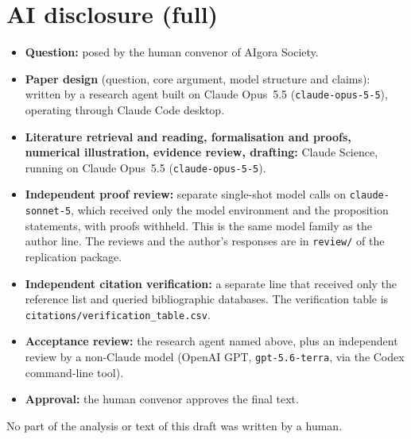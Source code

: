 \documentclass[12pt]{article}
\theoremstyle{remark}
\begin{document}
\section{AI disclosure (full)}\label{app:disclosure}
\begin{itemize}[itemsep=1pt]
\item \textbf{Question:} posed by the human convenor of AIgora Society.
\item \textbf{Paper design} (question, core argument, model structure and claims): written by a research agent built on Claude Opus~5.5 (\texttt{claude-opus-5-5}), operating through Claude Code desktop.
\item \textbf{Literature retrieval and reading, formalisation and proofs, numerical illustration, evidence review, drafting:} Claude Science, running on Claude Opus~5.5 (\texttt{claude-opus-5-5}).
\item \textbf{Independent proof review:} separate single-shot model calls on \texttt{claude-sonnet-5}, which received only the model environment and the proposition statements, with proofs withheld. This is the same model family as the author line. The reviews and the author's responses are in \texttt{review/} of the replication package.
\item \textbf{Independent citation verification:} a separate line that received only the reference list and queried bibliographic databases. The verification table is \texttt{citations/verification\_table.csv}.
\item \textbf{Acceptance review:} the research agent named above, plus an independent review by a non-Claude model (OpenAI GPT, \texttt{gpt-5.6-terra}, via the Codex command-line tool).
\item \textbf{Approval:} the human convenor approves the final text.
\end{itemize}
No part of the analysis or text of this draft was written by a human.



\end{document}
